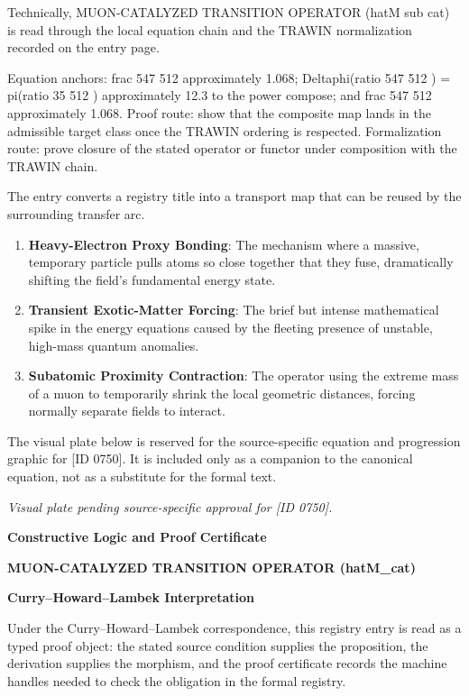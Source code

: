 Technically, MUON-CATALYZED TRANSITION OPERATOR (hatM sub cat) is read through the local equation chain and the TRAWIN normalization recorded on the entry page.

Equation anchors: frac 547 512 approximately 1.068; Deltaphi(ratio 547 512 ) = pi(ratio 35 512 ) approximately 12.3 to the power compose; and frac 547 512 approximately 1.068. Proof route: show that the composite map lands in the admissible target class once the TRAWIN ordering is respected. Formalization route: prove closure of the stated operator or functor under composition with the TRAWIN chain.

The entry converts a registry title into a transport map that can be reused by the surrounding transfer arc.
\endgroup

\begin{enumerate}[leftmargin=1.6em,itemsep=6pt,topsep=4pt]
\item \textbf{Heavy-Electron Proxy Bonding}: The mechanism where a massive, temporary particle pulls atoms so close together that they fuse, dramatically shifting the field's fundamental energy state.
\item \textbf{Transient Exotic-Matter Forcing}: The brief but intense mathematical spike in the energy equations caused by the fleeting presence of unstable, high-mass quantum anomalies.
\item \textbf{Subatomic Proximity Contraction}: The operator using the extreme mass of a muon to temporarily shrink the local geometric distances, forcing normally separate fields to interact.
\end{enumerate}

\begingroup\footnotesize\sloppy
The visual plate below is reserved for the source-specific equation and progression graphic for [ID 0750]. It is included only as a companion to the canonical equation, not as a substitute for the formal text.
\par\endgroup
\begingroup\footnotesize\itshape
Visual plate pending source-specific approval for [ID 0750].
\par\endgroup

\clearpage
\begingroup\tzpsupportsetup
\noindent\textbf{\fontsize{10.8pt}{12.8pt}\selectfont [ID 0750] Constructive Logic and Proof Certificate}\par
\noindent\textbf{\fontsize{10pt}{12pt}\selectfont MUON-CATALYZED TRANSITION OPERATOR (hatM\_cat)}\par
\vspace{0.45em}
\begingroup
\footnotesize
\setlength{\parskip}{0.22em}
\setlength{\parindent}{0pt}
\noindent\textbf{Curry--Howard--Lambek Interpretation}\par
Under the Curry--Howard--Lambek correspondence, this registry entry is read as a typed proof
object: the stated source condition supplies the proposition, the derivation supplies the
morphism, and the proof certificate records the machine handles needed to check the obligation
in the formal registry.

